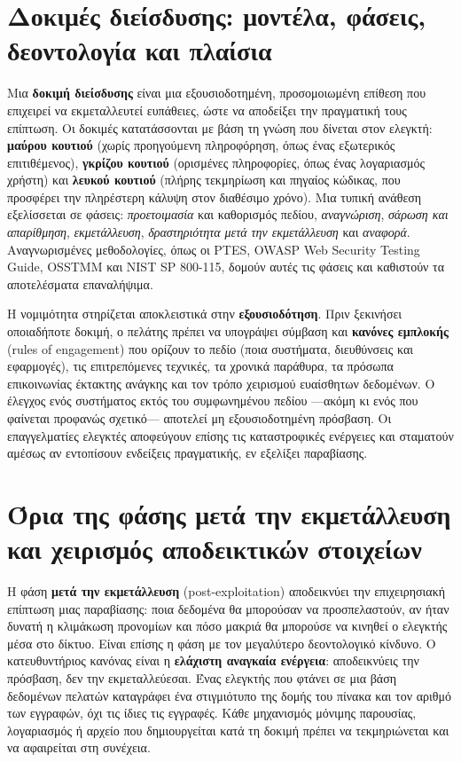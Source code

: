 \section{Δοκιμές διείσδυσης: μοντέλα, φάσεις, δεοντολογία και πλαίσια}\label{sec:10.4}
Μια \textbf{δοκιμή διείσδυσης} είναι μια εξουσιοδοτημένη, προσομοιωμένη επίθεση που επιχειρεί να εκμεταλλευτεί ευπάθειες, ώστε να αποδείξει την πραγματική τους επίπτωση. Οι δοκιμές κατατάσσονται με βάση τη γνώση που δίνεται στον ελεγκτή: \textbf{μαύρου κουτιού} (χωρίς προηγούμενη πληροφόρηση, όπως ένας εξωτερικός επιτιθέμενος), \textbf{γκρίζου κουτιού} (ορισμένες πληροφορίες, όπως ένας λογαριασμός χρήστη) και \textbf{λευκού κουτιού} (πλήρης τεκμηρίωση και πηγαίος κώδικας, που προσφέρει την πληρέστερη κάλυψη στον διαθέσιμο χρόνο). Μια τυπική ανάθεση εξελίσσεται σε φάσεις: \emph{προετοιμασία} και καθορισμός πεδίου, \emph{αναγνώριση}, \emph{σάρωση και απαρίθμηση}, \emph{εκμετάλλευση}, \emph{δραστηριότητα μετά την εκμετάλλευση} και \emph{αναφορά}. Αναγνωρισμένες μεθοδολογίες, όπως οι PTES, OWASP Web Security Testing Guide, OSSTMM και NIST SP 800-115, δομούν αυτές τις φάσεις και καθιστούν τα αποτελέσματα επαναλήψιμα.

Η νομιμότητα στηρίζεται αποκλειστικά στην \textbf{εξουσιοδότηση}. Πριν ξεκινήσει οποιαδήποτε δοκιμή, ο πελάτης πρέπει να υπογράψει σύμβαση και \textbf{κανόνες εμπλοκής} (rules of engagement) που ορίζουν το πεδίο (ποια συστήματα, διευθύνσεις και εφαρμογές), τις επιτρεπόμενες τεχνικές, τα χρονικά παράθυρα, τα πρόσωπα επικοινωνίας έκτακτης ανάγκης και τον τρόπο χειρισμού ευαίσθητων δεδομένων. Ο έλεγχος ενός συστήματος εκτός του συμφωνημένου πεδίου —ακόμη κι ενός που φαίνεται προφανώς σχετικό— αποτελεί μη εξουσιοδοτημένη πρόσβαση. Οι επαγγελματίες ελεγκτές αποφεύγουν επίσης τις καταστροφικές ενέργειες και σταματούν αμέσως αν εντοπίσουν ενδείξεις πραγματικής, εν εξελίξει παραβίασης.

\section{Όρια της φάσης μετά την εκμετάλλευση και χειρισμός αποδεικτικών στοιχείων}\label{sec:10.5}
Η φάση \textbf{μετά την εκμετάλλευση} (post-exploitation) αποδεικνύει την επιχειρησιακή επίπτωση μιας παραβίασης: ποια δεδομένα θα μπορούσαν να προσπελαστούν, αν ήταν δυνατή η κλιμάκωση προνομίων και πόσο μακριά θα μπορούσε να κινηθεί ο ελεγκτής μέσα στο δίκτυο. Είναι επίσης η φάση με τον μεγαλύτερο δεοντολογικό κίνδυνο. Ο κατευθυντήριος κανόνας είναι η \textbf{ελάχιστη αναγκαία ενέργεια}: αποδεικνύεις την πρόσβαση, δεν την εκμεταλλεύεσαι. Ένας ελεγκτής που φτάνει σε μια βάση δεδομένων πελατών καταγράφει ένα στιγμιότυπο της δομής του πίνακα και τον αριθμό των εγγραφών, όχι τις ίδιες τις εγγραφές. Κάθε μηχανισμός μόνιμης παρουσίας, λογαριασμός ή αρχείο που δημιουργείται κατά τη δοκιμή πρέπει να τεκμηριώνεται και να αφαιρείται στη συνέχεια.

